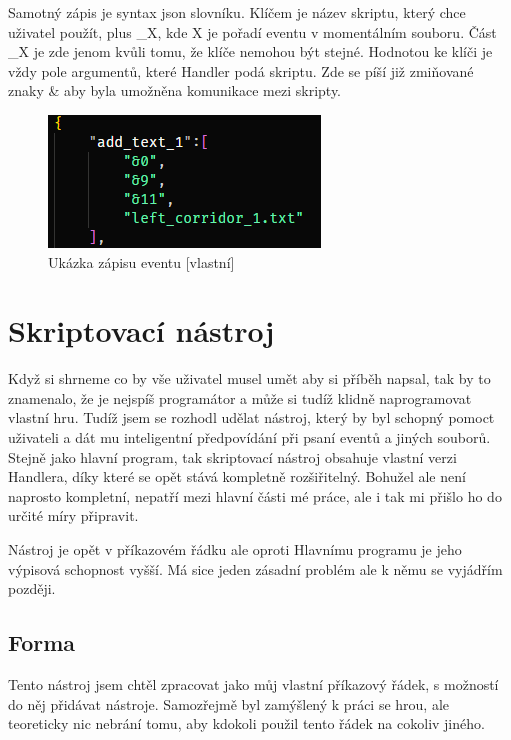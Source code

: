 \documentclass[12pt,a4paper]{article}
\begin{document}
Samotný zápis je syntax json slovníku. Klíčem je název skriptu, který chce uživatel použít, plus \_X, kde X je pořadí eventu v momentálním souboru. Část \_X je zde jenom kvůli tomu, že klíče nemohou být stejné. Hodnotou ke klíči je vždy pole argumentů, které Handler podá skriptu. Zde se píší již zmiňované znaky \& aby byla umožněna komunikace mezi skripty.

\begin{figure}[H]
    \centering
    \includegraphics[width=\textwidth-3 cm]{pictures/event.png}
    \caption{Ukázka zápisu eventu [vlastní]}
\end{figure}
\section{Skriptovací nástroj}
Když si shrneme co by vše uživatel musel umět aby si příběh napsal, tak by to znamenalo, že je nejspíš programátor a může si tudíž klidně naprogramovat vlastní hru. Tudíž jsem se rozhodl udělat nástroj, který by byl schopný pomoct uživateli a dát mu inteligentní předpovídání při psaní eventů a jiných souborů. Stejně jako hlavní program, tak skriptovací nástroj obsahuje vlastní verzi Handlera, díky které se opět stává kompletně rozšiřitelný. Bohužel ale není naprosto kompletní, nepatří mezi hlavní části mé práce, ale i tak mi přišlo ho do určité míry připravit.

Nástroj je opět v příkazovém řádku ale oproti Hlavnímu programu je jeho výpisová schopnost vyšší. Má sice jeden zásadní problém ale k němu se vyjádřím později.

\subsection{Forma}
Tento nástroj jsem chtěl zpracovat jako můj vlastní příkazový řádek, s možností do něj přidávat nástroje. Samozřejmě byl zamýšlený k práci se hrou, ale teoreticky nic nebrání tomu, aby kdokoli použil tento řádek na cokoliv jiného. 
\end{document}
